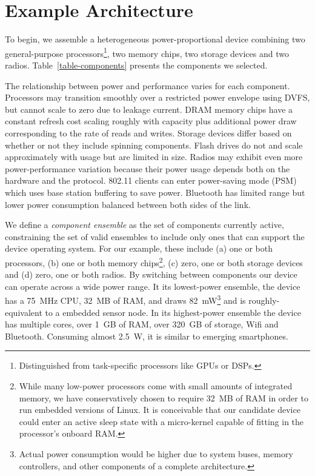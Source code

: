\vspace*{-0.1in}
\section{Example Architecture}
\label{section-architecture}



To begin, we assemble a heterogeneous power-proportional device combining two
general-purpose processors\footnote{Distinguished from task-specific
processors like GPUs or DSPs.}, two memory chips, two storage devices and two
radios. Table~\ref{table-components} presents the components we selected.

The relationship between power and performance varies for each component.
Processors may transition smoothly over a restricted power envelope using
DVFS, but cannot scale to zero due to leakage current. DRAM memory 
chips have a
constant refresh cost scaling roughly with capacity plus additional power draw
corresponding to the rate of reads and writes. Storage devices differ based on whether or not they include
spinning components. Flash drives do not and scale approximately with usage
but are limited in size. Radios may exhibit even more power-performance
variation because their power usage depends both on the hardware and the
protocol. 802.11 clients can enter power-saving mode (PSM) which uses base
station buffering to save power. Bluetooth has limited range but lower power
consumption balanced between both sides of the link.

We define a \textit{component ensemble} as the set of components currently
active, constraining the set of valid ensembles to include only ones that can
support the device operating system. For our example, these include (a) one
or both processors, (b) one or both memory chips\footnote{While many
low-power processors come with small amounts of integrated memory, we have
conservatively chosen to require 32~MB of RAM in order to run embedded
versions of Linux. It is conceivable that our candidate device could enter an
active sleep state with a micro-kernel capable of fitting in the processor's
onboard RAM.}, (c) zero, one or both storage devices and (d) zero, one or
both radios. By switching between components our device can operate across a
wide power range. It its lowest-power ensemble, the device has a 75~MHz CPU,
32~MB of RAM, and draws 82~mW\footnote{Actual power consumption would be
higher due to system buses, memory controllers, and other components of a
complete architecture.} and is roughly-equivalent to a embedded sensor node.
In its highest-power ensemble the device has multiple cores, over 1~GB of
RAM, over 320~GB of storage, Wifi and Bluetooth. Consuming almost 2.5~W, it
is similar to emerging smartphones.

